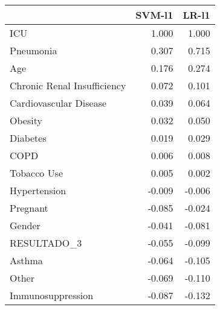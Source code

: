 \begin{tabular}{lrr}
\toprule
{} &  SVM-l1 &  LR-l1 \\
\midrule
ICU                         &   1.000 &  1.000 \\
Pneumonia                   &   0.307 &  0.715 \\
Age                         &   0.176 &  0.274 \\
Chronic Renal Insufficiency &   0.072 &  0.101 \\
Cardiovascular Disease      &   0.039 &  0.064 \\
Obesity                     &   0.032 &  0.050 \\
Diabetes                    &   0.019 &  0.029 \\
COPD                        &   0.006 &  0.008 \\
Tobacco Use                 &   0.005 &  0.002 \\
Hypertension                &  -0.009 & -0.006 \\
Pregnant                    &  -0.085 & -0.024 \\
Gender                      &  -0.041 & -0.081 \\
RESULTADO\_3                 &  -0.055 & -0.099 \\
Asthma                      &  -0.064 & -0.105 \\
Other                       &  -0.069 & -0.110 \\
Immunosuppression           &  -0.087 & -0.132 \\
\bottomrule
\end{tabular}

